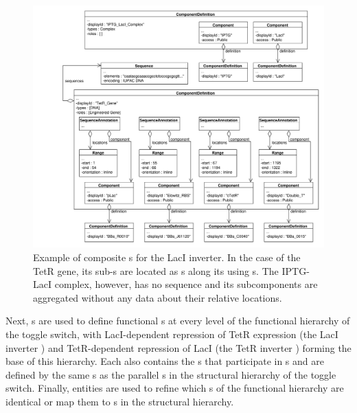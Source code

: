 \begin{figure}[ht]
\begin{center}
\includegraphics[width=\textwidth]{example_uml/toggle_2}
\caption[]{Example of composite s for the LacI inverter. In the case of the TetR gene, its sub-s are located as s along its  using s. The IPTG-LacI complex, however, has no sequence and its subcomponents are aggregated without any data about their relative locations.}
\label{uml:ex_comp_def_compo}
\end{center}
\end{figure}

Next, s are used to define functional s at every level of the functional hierarchy of the toggle switch, with LacI-dependent repression of TetR expression (the LacI inverter ) and TetR-dependent repression of LacI (the TetR inverter ) forming the base of this hierarchy. Each  also contains the s that participate in s and are defined by the same s as the parallel s in the structural hierarchy of the toggle switch. Finally,  entities are used to refine which s of the functional hierarchy are identical or map them to s in the structural hierarchy.


